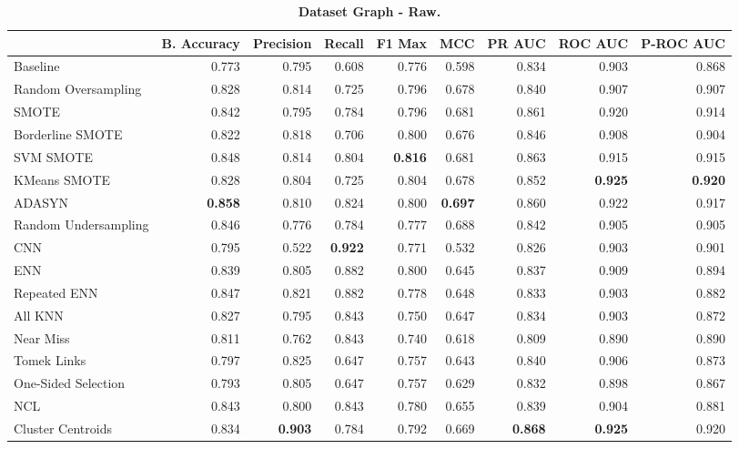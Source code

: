 \begin{table}[H]
    \centering
    \setlength\tabcolsep{2pt}
    \begin{tabularx}{\textwidth}{lRRRRRRRR}
        & B. Accuracy & Precision & Recall & F1 Max & MCC & PR AUC & ROC AUC & P-ROC AUC \\
        \midrule
        Baseline & 0.773 & 0.795 & 0.608 & 0.776 & 0.598 & 0.834 & 0.903 & 0.868 \\
        Random Oversampling & 0.828 & 0.814 & 0.725 & 0.796 & 0.678 & 0.840 & 0.907 & 0.907 \\
        SMOTE & 0.842 & 0.795 & 0.784 & 0.796 & 0.681 & 0.861 & 0.920 & 0.914 \\
        Borderline SMOTE & 0.822 & 0.818 & 0.706 & 0.800 & 0.676 & 0.846 & 0.908 & 0.904 \\
        SVM SMOTE & 0.848 & 0.814 & 0.804 & \textbf{0.816} & 0.681 & 0.863 & 0.915 & 0.915 \\
        KMeans SMOTE & 0.828 & 0.804 & 0.725 & 0.804 & 0.678 & 0.852 & \textbf{0.925} & \textbf{0.920} \\
        ADASYN & \textbf{0.858} & 0.810 & 0.824 & 0.800 & \textbf{0.697} & 0.860 & 0.922 & 0.917 \\
        Random Undersampling & 0.846 & 0.776 & 0.784 & 0.777 & 0.688 & 0.842 & 0.905 & 0.905 \\
        CNN & 0.795 & 0.522 & \textbf{0.922} & 0.771 & 0.532 & 0.826 & 0.903 & 0.901 \\
        ENN & 0.839 & 0.805 & 0.882 & 0.800 & 0.645 & 0.837 & 0.909 & 0.894 \\
        Repeated ENN & 0.847 & 0.821 & 0.882 & 0.778 & 0.648 & 0.833 & 0.903 & 0.882 \\
        All KNN & 0.827 & 0.795 & 0.843 & 0.750 & 0.647 & 0.834 & 0.903 & 0.872 \\
        Near Miss & 0.811 & 0.762 & 0.843 & 0.740 & 0.618 & 0.809 & 0.890 & 0.890 \\
        Tomek Links & 0.797 & 0.825 & 0.647 & 0.757 & 0.643 & 0.840 & 0.906 & 0.873 \\
        One-Sided Selection & 0.793 & 0.805 & 0.647 & 0.757 & 0.629 & 0.832 & 0.898 & 0.867 \\
        NCL & 0.843 & 0.800 & 0.843 & 0.780 & 0.655 & 0.839 & 0.904 & 0.881 \\
        Cluster Centroids & 0.834 & \textbf{0.903} & 0.784 & 0.792 & 0.669 & \textbf{0.868} & \textbf{0.925} & 0.920 \\
    \end{tabularx}
    \vspace{1mm}
    \caption{\textbf{Dataset Graph - Raw.}}
\end{table}
